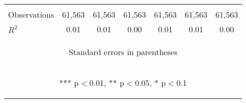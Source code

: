 \begin{center}
\begin{tabular}{lcccccc}
\vspace{4pt} & \begin{footnotesize}\end{footnotesize} & \begin{footnotesize}\end{footnotesize} & \begin{footnotesize}\end{footnotesize} & \begin{footnotesize}\end{footnotesize} & \begin{footnotesize}\end{footnotesize} & \begin{footnotesize}\end{footnotesize} \\
Observations & 61,563 & 61,563 & 61,563 & 61,563 & 61,563 & 61,563 \\
 $R^2$ & 0.01 & 0.01 & 0.00 & 0.01 & 0.01 & 0.00 \\ \hline
\multicolumn{7}{c}{\begin{footnotesize} Standard errors in parentheses\end{footnotesize}} \\
\multicolumn{7}{c}{\begin{footnotesize} *** p$<$0.01, ** p$<$0.05, * p$<$0.1\end{footnotesize}} \\
\end{tabular}
\end{center}
